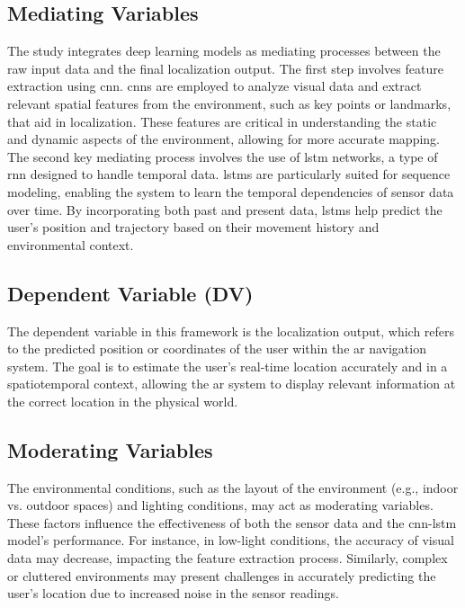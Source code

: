 \begin{refsection}
\subsection{Mediating Variables}

The study integrates deep learning models as mediating processes between the raw input data and the final localization output. The first step involves feature extraction using \gls{cnn}. \gls{cnn}s are employed to analyze visual data and extract relevant spatial features from the environment, such as key points or landmarks, that aid in localization. These features are critical in understanding the static and dynamic aspects of the environment, allowing for more accurate mapping.
The second key mediating process involves the use of \gls{lstm} networks, a type of \gls{rnn} designed to handle temporal data. \gls{lstm}s are particularly suited for sequence modeling, enabling the system to learn the temporal dependencies of sensor data over time. By incorporating both past and present data, \gls{lstm}s help predict the user’s position and trajectory based on their movement history and environmental context.

\subsection{Dependent Variable (DV)}

The dependent variable in this framework is the localization output, which refers to the predicted position or coordinates of the user within the \gls{ar} navigation system. The goal is to estimate the user’s real-time location accurately and in a spatiotemporal context, allowing the \gls{ar} system to display relevant information at the correct location in the physical world.

\subsection{Moderating Variables}

The environmental conditions, such as the layout of the environment (e.g., indoor vs. outdoor spaces) and lighting conditions, may act as moderating variables. These factors influence the effectiveness of both the sensor data and the \gls{cnn}-\gls{lstm} model’s performance. For instance, in low-light conditions, the accuracy of visual data may decrease, impacting the feature extraction process. Similarly, complex or cluttered environments may present challenges in accurately predicting the user’s location due to increased noise in the sensor readings.


\end{refsection}
